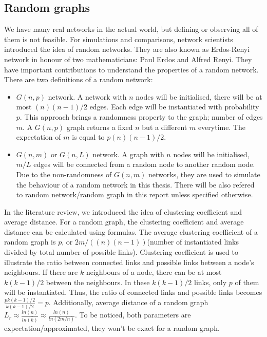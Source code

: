 \documentclass[12pt]{article}
\begin{document}
\subsection{Random graphs}
We have many real networks in the actual world, but defining or observing all of them is not feasible. For simulations and comparisons, network scientists introduced the idea of random networks. They are also known as Erdos-Renyi network in honour of two mathematicians: Paul Erdos and Alfred Renyi. They have important contributions to understand the properties of a random network\cite{barabási2016network}.\\
\noindent
There are two definitions of a random network:
\begin{itemize}
    \item $G(n,p)$ network. A network with $n$ nodes will be initialised, there will be at most $(n)(n-1)/2$ edges. Each edge will be instantiated with probability $p$. This approach brings a randomness property to the graph; number of edges $m$. A $G(n,p)$ graph returns a fixed $n$ but a different $m$ everytime. The expectation of $m$ is equal to $p(n)(n-1)/2$.
    \item $G(n,m)$ or $G(n,L)$ network. A graph with $n$ nodes will be initialised, $m/L$ edges will be connected from a random node to another random node. Due to the non-randomness of $G(n,m)$ networks, they are used to simulate the behaviour of a random network in this thesis. There will be also refered to random network/random graph in this report unless specified otherwise.
\end{itemize}

\noindent
In the literature review, we introduced the idea of clustering coefficient and average distance. For a random graph, the clustering coefficient and average distance can be calculated using formulas.\cite{barabási2016network} The average clustering coefficient of a random graph is $p$, or $2m/((n)(n-1))$(number of instantiated links divided by total number of possible links). Clustering coefficient is used to illustrate the ratio between connected links and possible links between a node's neighbours. If there are $k$ neighbours of a node, there can be at most $k(k-1)/2$ between the neighbours. In these $k(k-1)/2$ links, only $p$ of them will be instantiated. Thus, the ratio of connected links and possible links becomes $\frac{pk(k-1)/2}{k(k-1)/2}=p$. Additionally, average distance of a random graph $L_r \approx \frac{ln(n)}{ln\bar{(k)}}\approx \frac{ln(n)}{ln(2m/n)}$. To be noticed, both parameters are expectation/approximated, they won't be exact for a random graph.
\end{document}
